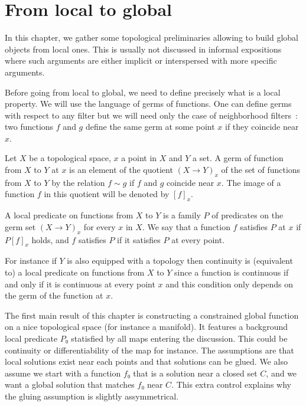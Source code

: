 \chapter{From local to global}%
\label{cha:from_local_to_global}

In this chapter, we gather some topological preliminaries allowing to build
global objects from local ones. This is usually not discussed in informal expositions
where such arguments are either implicit or interspersed with more specific arguments.

Before going from local to global, we need to define precisely what is a local
property. We will use the language of germs of functions.
One can define germs with respect to any filter but
we will need only the case of neighborhood filters~: two functions $f$ and $g$
define the same germ at some point $x$ if they coincide near $x$.

\begin{definition}\label{def:germ}\leanok
  Let $X$ be a topological space, $x$ a point in $X$ and $Y$ a set. A germ of function
  from $X$ to $Y$ at $x$ is an element of the quotient $(X → Y)_x$ of the set of functions
  from $X$ to $Y$ by the relation $f ∼ g$ if $f$ and $g$ coincide near $x$. The image
  of a function $f$ in this quotient will be denoted by $[f]_x$.

  A local predicate on functions from $X$ to $Y$ is a family $P$ of predicates on the
  germ set $(X → Y)_x$ for every $x$ in $X$. We say that a function $f$
  satisfies $P$ at $x$ if $P [f]_x$ holds, and $f$ satisfies $P$ if it
  satisfies $P$ at every point.
\end{definition}

For instance if $Y$ is also equipped with a topology then continuity is
(equivalent to) a local predicate on functions from $X$ to $Y$ since a function
is continuous if and only if it is continuous at every point $x$ and this
condition only depends on the germ of the function at $x$.

The first main result of this chapter is constructing a constrained global
function on a nice topological space (for instance a manifold). It features a
background local predicate $P₀$ statisfied by all maps entering the discussion.
This could be continuity or differentiability of the map for instance. The
assumptions are that local solutions exist near each points and that solutions
can be glued. We also assume we start with a function $f₀$ that is a solution
near a closed set $C$, and we want a global solution that matches $f₀$ near $C$.
This extra control explains why the gluing assumption is slightly assymmetrical.

